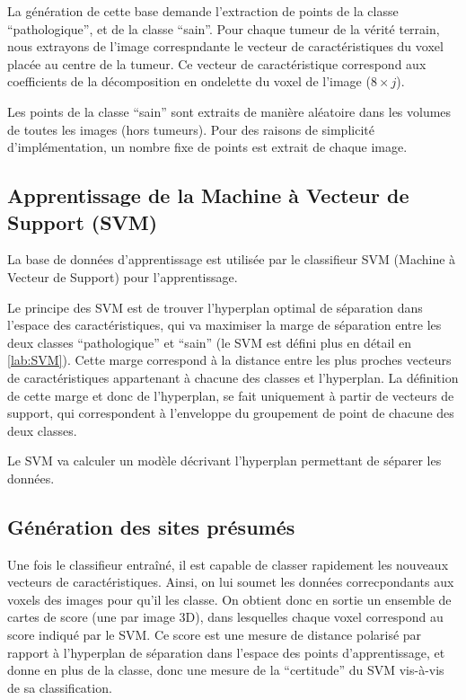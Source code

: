 La génération de cette base demande l'extraction de points de la classe ``pathologique'', et de la classe ``sain''. Pour chaque tumeur de la vérité terrain, nous extrayons de l'image correspndante le vecteur de caractéristiques du voxel placée au centre de la tumeur. Ce vecteur de caractéristique correspond aux coefficients de la décomposition en ondelette du voxel de l'image ($8 \times j$).

Les points de la classe ``sain'' sont extraits de manière aléatoire dans les volumes de toutes les images (hors tumeurs). Pour des raisons de simplicité d'implémentation, un nombre fixe de points est extrait de chaque image.

\subsection{Apprentissage de la Machine à Vecteur de Support (SVM)}

La base de données d'apprentissage est utilisée  par le classifieur SVM (Machine à Vecteur de Support) pour l'apprentissage.

Le principe des SVM est de trouver l’hyperplan optimal de séparation dans l'espace des caractéristiques, qui va maximiser la marge de séparation entre les deux classes ``pathologique''  et ``sain'' (le SVM est défini plus en détail en \ref{lab:SVM}). Cette marge correspond à la distance entre les plus proches vecteurs de caractéristiques appartenant à chacune des classes et l'hyperplan. La définition de cette marge et donc de l’hyperplan, se fait uniquement à partir de vecteurs de support, qui correspondent à l'enveloppe du groupement de point de chacune des deux classes.

Le SVM va calculer un modèle décrivant l'hyperplan permettant de séparer les données.

\subsection{Génération des sites présumés}
\label{lab:aggregatsCAD}
Une fois le classifieur entraîné, il est capable de classer rapidement les nouveaux vecteurs de caractéristiques. Ainsi, on lui soumet les données correcpondants aux voxels des images pour qu'il les classe. On obtient donc en sortie un ensemble de cartes de score (une par image 3D), dans lesquelles chaque voxel correspond au score indiqué par le SVM. Ce score est une mesure de distance polarisé par rapport à l'hyperplan de séparation dans l'espace des points d'apprentissage, et donne en plus de la classe, donc une mesure de la ``certitude'' du SVM vis-à-vis de sa classification.

